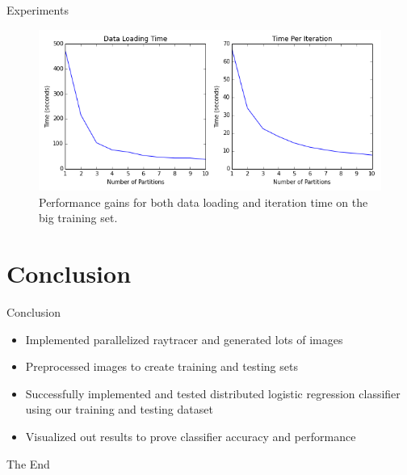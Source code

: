 \documentclass{beamer}
\begin{document}
\begin{frame}{Experiments}

\begin{figure}[h]
\begin{center}
\includegraphics[scale=0.5]{big_metrics.png}
\caption{Performance gains for both data loading and iteration time on the big training set.}
\label{fig:small}
\end{center}
\end{figure}

\end{frame}


\section{Conclusion}

\begin{frame}{Conclusion}

\begin{itemize}
\item Implemented parallelized raytracer and generated lots of images
\item Preprocessed images to create training and testing sets
\item Successfully implemented and tested distributed logistic regression classifier using our training and testing dataset
\item Visualized out results to prove classifier accuracy and performance
\end{itemize}

\end{frame}



\begin{frame}
\Huge{\centerline{The End}}
\end{frame}


%
%
\end{document}
